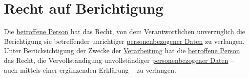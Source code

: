 \chapter{Recht auf Berichtigung}
\label{ch:16}


Die \hyperref[itm:04-1]{betroffene Person} hat das Recht, von dem Verantwortlichen unverzüglich die Berichtigung sie betreffender unrichtiger
\hyperref[itm:04-1]{personenbezogener Daten} zu verlangen. Unter Berücksichtigung der Zwecke der \hyperref[itm:04-2]{Verarbeitung} hat die \hyperref[itm:04-1]{betroffene Person} das
Recht, die Vervollständigung unvollständiger \hyperref[itm:04-1]{personenbezogener Daten} -- auch mittels einer ergänzenden Erklärung -- zu
verlangen.



